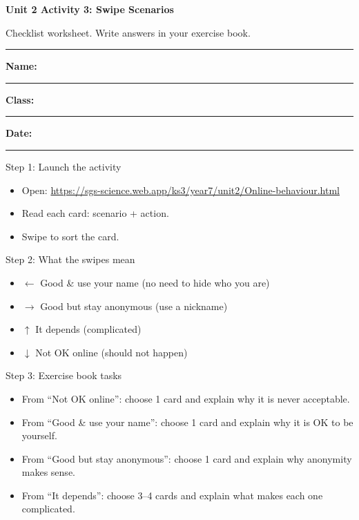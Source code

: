 \documentclass[10pt,a4paper]{article}
\newcommand{\NameLine}{\textbf{Name:} \rule{6.8cm}{0.4pt}\hfill \textbf{Class:} \rule{3cm}{0.4pt}\hfill \textbf{Date:} \rule{3cm}{0.4pt}}
\begin{document}
{\Large\bfseries\color{sgsNavy} Unit 2 Activity 3: Swipe Scenarios\par}
{\color{sgsGrey}Checklist worksheet. Write answers in your exercise book.\par}
\vspace{0.2em}
\hrule
\vspace{0.6em}
\NameLine

\vspace{0.6em}
\begin{StepBox}{Step 1: Launch the activity}
\begin{itemize}[leftmargin=*,label=$\square$,nosep]
  \item Open: \url{https://sgs-science.web.app/ks3/year7/unit2/Online-behaviour.html}
  \item Read each card: scenario + action.
  \item Swipe to sort the card.
\end{itemize}
\end{StepBox}

\begin{StepBox}{Step 2: What the swipes mean}
\begin{itemize}[leftmargin=*,label=$\square$,nosep]
  \item $\leftarrow$ Good \& use your name (no need to hide who you are)
  \item $\rightarrow$ Good but stay anonymous (use a nickname)
  \item $\uparrow$ It depends (complicated)
  \item $\downarrow$ Not OK online (should not happen)
\end{itemize}
\end{StepBox}

\begin{StepBox}{Step 3: Exercise book tasks}
\begin{itemize}[leftmargin=*,label=$\square$,nosep]
  \item From ``Not OK online'': choose 1 card and explain why it is never acceptable.
  \item From ``Good \& use your name'': choose 1 card and explain why it is OK to be yourself.
  \item From ``Good but stay anonymous'': choose 1 card and explain why anonymity makes sense.
  \item From ``It depends'': choose 3--4 cards and explain what makes each one complicated.
\end{itemize}
\end{StepBox}
\end{document}
